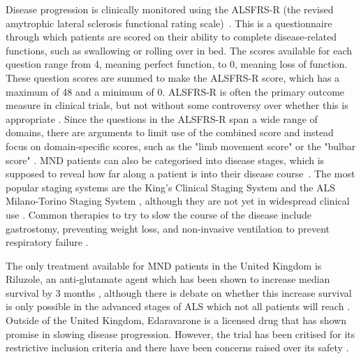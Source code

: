 Disease progression is clinically monitored using the ALSFRS-R (the revised amytrophic lateral sclerosis functional rating scale)~\cite{cedarbaumALSFRSRRevisedALS1999}. This is a questionnaire through which patients are scored on their ability to complete disease-related functions, such as swallowing or rolling over in bed. The scores available for each question range from 4, meaning perfect function, to 0, meaning loss of function. These question scores are summed to make the ALSFRS-R score, which has a maximum of 48 and a minimum of 0. ALSFRS-R is often the primary outcome measure in clinical trials, but not without some controversy over whether this is appropriate \cite{vaneijkOldFriendWho2021}. Since the questions in the ALSFRS-R span a wide range of domains, there are arguments to limit use of the combined score and instead focus on domain-specific scores, such as the "limb movement score" or the "bulbar score" \cite{rooneyWhatDoesALSFRSR2017}.
MND patients can also be categorised into disease stages, which is supposed to reveal how far along a patient is into their disease course~\cite{feldmanAmyotrophicLateralSclerosis2022}. The most popular staging systems are the King's Clinical Staging System \cite{rocheProposedStagingSystem2012} and the ALS Milano-Torino Staging System \cite{chioDevelopmentEvaluationClinical2015}, although they are not yet in widespread clinical use \cite{fangComparisonKingMiToS2017}. Common therapies to try to slow the course of the disease include gastrostomy, preventing weight loss, and non-invasive ventilation to prevent respiratory failure \cite{bourkeEffectsNoninvasiveVentilation2006}.

The only treatment available for MND patients in the United Kingdom is Riluzole, an anti-glutamate agent which has been shown to increase median survival by 3 months \cite{millerRiluzoleAmyotrophicLateral2012, hinchcliffeRiluzoleRealworldEvidence2017}, although there is debate on whether this increase survival is only possible in the advanced stages of ALS which not all patients will reach \cite{andrewsRealworldEvidenceRiluzole2020}.
Outside of the United Kingdom, Edaravarone is a licensed drug that has shown promise in slowing disease progression. However, the trial has been critised for its restrictive inclusion criteria and there have been concerns raised over its safety \cite{witzelSafetyEffectivenessLongterm2022}.

